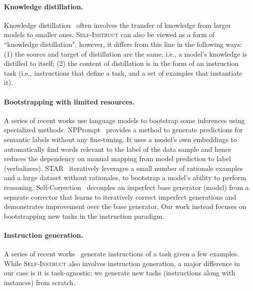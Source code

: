 \documentclass[11pt]{article}
\newcommand{\nascomment}[1]{\textcolor{blue}{\textbf{[#1 -- \textsc{nas}]}}}
\newcommand{\name}{\textsc{Self-Instruct}}
\begin{document}
\paragraph{Knowledge distillation.}
Knowledge distillation~\cite{hinton2015distilling,Sanh2019DistilBERTAD, west2021symbolic,luciecharlotte2022teachingsmallmodels} often involves the transfer of knowledge from larger models to smaller ones. \name{} can also be viewed as a form of ``knowledge distillation", however, it differs from this line in the following ways: (1) the source and target of distillation are the same, i.e., a model's knowledge is distilled to itself; (2) the content of distillation is in the form of an instruction task (i.e., instructions that define a task, and a set of examples that instantiate it).

\paragraph{Bootstrapping with limited resources.} A series of recent works use language models to bootstrap some inferences using specialized methods.  
NPPrompt~\cite{zhao2022pre} provides a method to generate predictions for semantic labels without any fine-tuning. It uses a model's own embeddings to automatically find words relevant to the label of the data sample and hence reduces the dependency on manual mapping from model prediction to label (verbalizers).
STAR~\cite{zelikman2022star} iteratively leverages a small number of rationale examples and a large dataset without rationales, to bootstrap a model's ability to perform reasoning.  Self-Correction~\cite{welleck2022generating} decouples an imperfect base generator (model) from a separate corrector that learns to iteratively correct imperfect generations and demonstrates improvement over the base generator. Our work instead focuses on bootstrapping new tasks in the instruction paradigm.

\paragraph{Instruction generation.}
A series of recent works~\cite{zhou2022large, ye2022guess, singh2022explaining, honovich2022instruction} generate instructions of a task given a few examples. While \name{} also involves instruction generation, a major difference in our case is it is task-agnostic; we generate new tasks (instructions along with instances) from scratch.
\end{document}

